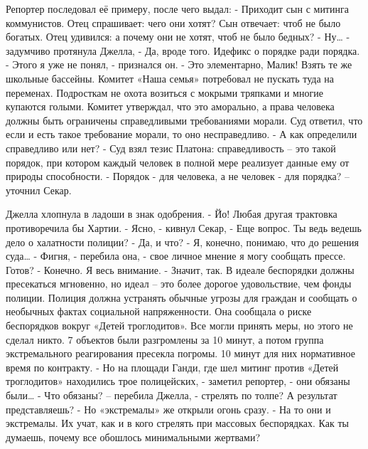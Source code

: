 \documentclass[10pt,final]{book}
\begin{document}
Репортер последовал её примеру, после чего выдал:
- Приходит сын с митинга коммунистов. Отец спрашивает: чего они хотят? Сын отвечает: чтоб не было богатых. Отец удивился: а почему они не хотят, чтоб не было бедных?
- Ну\ldots{} - задумчиво протянула Джелла, - Да, вроде того. Идефикс о порядке ради порядка.
- Этого я уже не понял, - признался он.
- Это элементарно, Малик! Взять те же школьные бассейны. Комитет «Наша семья» потребовал не пускать туда на переменах. Подросткам не охота возиться с мокрыми тряпками и многие купаются голыми. Комитет утверждал, что это аморально, а права человека должны быть ограничены справедливыми требованиями морали. Суд ответил, что если и есть такое требование морали, то оно несправедливо.
- А как определили справедливо или нет?
- Суд взял тезис Платона: справедливость -- это такой порядок, при котором каждый человек в полной мере реализует данные ему от природы способности.
- Порядок - для человека, а не человек - для порядка? -- уточнил Секар.

Джелла хлопнула в ладоши в знак одобрения.
- Йо! Любая другая трактовка противоречила бы Хартии.
- Ясно, - кивнул Секар, - Еще вопрос. Ты ведь ведешь дело о халатности полиции?
- Да, и что?
- Я, конечно, понимаю, что до решения суда\ldots{}
- Фигня, - перебила она, - свое личное мнение я могу сообщать прессе. Готов?
- Конечно. Я весь внимание.
- Значит, так. В идеале беспорядки должны пресекаться мгновенно, но идеал -- это более дорогое удовольствие, чем фонды полиции. Полиция должна устранять обычные угрозы для граждан и сообщать о необычных фактах социальной напряженности. Она сообщала о риске беспорядков вокруг «Детей троглодитов». Все могли принять меры, но этого не сделал никто. 7 объектов были разгромлены за 10 минут, а потом группа экстремального реагирования пресекла погромы. 10 минут для них нормативное время по контракту.
- Но на площади Ганди, где шел митинг против «Детей троглодитов» находились трое полицейских, - заметил репортер, - они обязаны были\ldots{}
- Что обязаны? -- перебила Джелла, - стрелять по толпе? А результат представляешь?
- Но «экстремалы» же открыли огонь сразу.
- На то они и экстремалы. Их учат, как и в кого стрелять при массовых беспорядках. Как ты думаешь, почему все обошлось минимальными жертвами?
\end{document}
